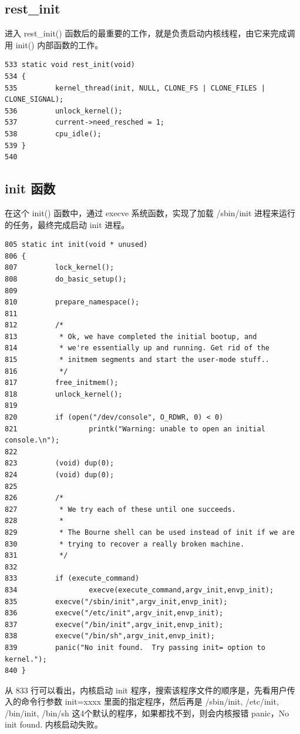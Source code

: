 \subsection{rest\_init}

进入 rest\_init()
函数后的最重要的工作，就是负责启动内核线程，由它来完成调用 init()
内部函数的工作。

{\begin{shaded}\begin{verbatim}
533 static void rest_init(void)
534 {
535         kernel_thread(init, NULL, CLONE_FS | CLONE_FILES | CLONE_SIGNAL);
536         unlock_kernel();
537         current->need_resched = 1;
538         cpu_idle();
539 }
540 
\end{verbatim}\end{shaded}}
\subsection{init 函数}

在这个 init() 函数中，通过 execve 系统函数，实现了加载 /sbin/init
进程来运行的任务，最终完成启动 init 进程。

{\begin{shaded}\begin{verbatim}
805 static int init(void * unused)
806 {
807         lock_kernel();
808         do_basic_setup();
809 
810         prepare_namespace();
811 
812         /*
813          * Ok, we have completed the initial bootup, and
814          * we're essentially up and running. Get rid of the
815          * initmem segments and start the user-mode stuff..
816          */
817         free_initmem();
818         unlock_kernel();
819 
820         if (open("/dev/console", O_RDWR, 0) < 0)
821                 printk("Warning: unable to open an initial console.\n");
822 
823         (void) dup(0);
824         (void) dup(0);
825 
826         /*
827          * We try each of these until one succeeds.
828          *
829          * The Bourne shell can be used instead of init if we are 
830          * trying to recover a really broken machine.
831          */
832 
833         if (execute_command)
834                 execve(execute_command,argv_init,envp_init);
835         execve("/sbin/init",argv_init,envp_init);
836         execve("/etc/init",argv_init,envp_init);
837         execve("/bin/init",argv_init,envp_init);
838         execve("/bin/sh",argv_init,envp_init);
839         panic("No init found.  Try passing init= option to kernel.");
840 }
\end{verbatim}\end{shaded}}
从 833 行可以看出，内核启动 init
程序，搜索该程序文件的顺序是，先看用户传入的命令行参数 init=xxxx
里面的指定程序，然后再是 /sbin/init, /etc/init, /bin/init, /bin/sh
这4个默认的程序，如果都找不到，则会内核报错 panic，No init found.
内核启动失败。

